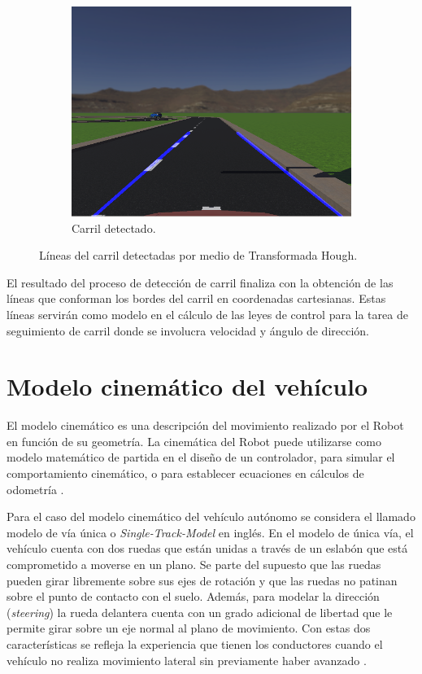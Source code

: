 \begin{figure}[h]
\begin{subfigure}[b]{0.3\textwidth}
         \centering
         \includegraphics[width=\textwidth]{Figures/Figures_Cap04/combo_img.png}
         \caption{Carril detectado.}
         \label{fig:combo_img}
     \end{subfigure}
     
    \caption{Líneas del carril detectadas por medio de Transformada Hough.}
    \label{fig:lane_detect}
\end{figure}

El resultado del proceso de detección de carril finaliza con la obtención de las líneas que conforman los bordes del carril en coordenadas cartesianas. Estas líneas servirán como modelo en el cálculo de las leyes de control para la tarea de seguimiento de carril donde se involucra velocidad y ángulo de dirección.

\section{Modelo cinemático del vehículo} \label{sec:modelo_cinemático_del_vehículo}

El modelo cinemático es una descripción del movimiento realizado por el Robot en función de su geometría. La cinemática del Robot puede utilizarse como modelo matemático de partida en el diseño de un controlador, para simular el comportamiento cinemático, o para establecer ecuaciones en cálculos de odometría \cite{martinez2003modelado}. 

Para el caso del modelo cinemático del vehículo autónomo se considera el llamado modelo de vía única o \textit{Single-Track-Model} en inglés. En el modelo de única vía, el vehículo cuenta con dos ruedas que están unidas a través de un eslabón que está comprometido a moverse en un plano. Se parte del supuesto que las ruedas pueden girar libremente sobre sus ejes de rotación y que las ruedas no patinan sobre el punto de contacto con el suelo. Además, para modelar la dirección (\textit{steering}) la rueda delantera cuenta con un grado adicional de libertad que le permite girar sobre un eje normal al plano de movimiento. Con estas dos características se refleja la experiencia que tienen los conductores cuando el vehículo no realiza movimiento lateral sin previamente haber avanzado \cite{paden2016survey}. 

